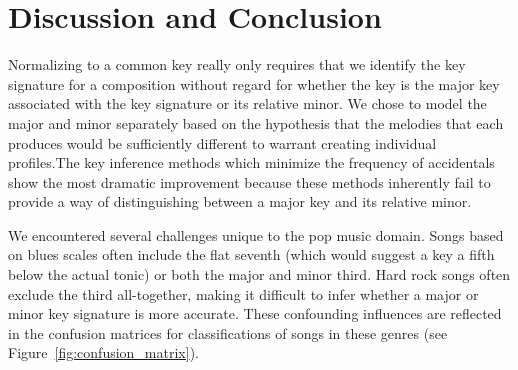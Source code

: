 \documentclass[letterpaper]{article}
\begin{document}
\section{Discussion and Conclusion}

Normalizing to a common key really only requires that we identify the key signature for a composition without regard for whether the key is the major key associated with the key signature or its relative minor. We chose to model the major and minor separately based on the hypothesis that the melodies that each produces would be sufficiently different to warrant creating individual profiles.The key inference methods which minimize the frequency of accidentals show the most dramatic improvement because these methods inherently fail to provide a way of distinguishing between a major key and its relative minor.

We encountered several challenges unique to the pop music domain. Songs based on blues scales often include the flat seventh (which would suggest a key a fifth below the actual tonic) or both the major and minor third. Hard rock songs often exclude the third all-together, making it difficult to infer whether a major or minor key signature is more accurate. These confounding influences are reflected in the confusion matrices for classifications of songs in these genres (see Figure~\ref{fig:confusion_matrix}).
\end{document}
